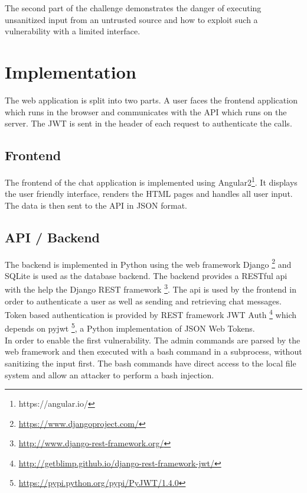 \documentclass[12pt,a4paper]{article}
\begin{document}
The second part of the challenge demonstrates the danger of executing unsanitized input from an untrusted source and how to exploit such a vulnerability with a limited interface.


\section{Implementation}

The web application is split into two parts. A user faces the frontend application which runs in the browser and communicates with the API which runs on the server. The JWT is sent in the header of each request to authenticate the calls.

\subsection{Frontend}
The frontend of the chat application is implemented using Angular2\footnote{https://angular.io/}. It displays the user friendly interface, renders the HTML pages and handles all user input. The data is then sent to the API in JSON format. 
 
\subsection{API / Backend}
The backend is implemented in Python using the web framework Django \footnote{\url{https://www.djangoproject.com/}} and SQLite is used as the database backend. The backend provides a RESTful api with the help the Django REST framework \footnote{\url{http://www.django-rest-framework.org/}}. The api is used by the frontend in order to authenticate a user as well as sending and retrieving chat messages. Token based authentication is provided by REST framework JWT Auth \footnote{\url{http://getblimp.github.io/django-rest-framework-jwt/}} which depends on pyjwt \footnote{\url{https://pypi.python.org/pypi/PyJWT/1.4.0}}, a Python implementation of JSON Web Tokens. \\
In order to enable the first vulnerability. The admin commands are parsed by the web framework and then executed with a bash command in a subprocess, without sanitizing the input first. The bash commands have direct access to the local file system and allow an attacker to perform a bash injection.
\end{document}
